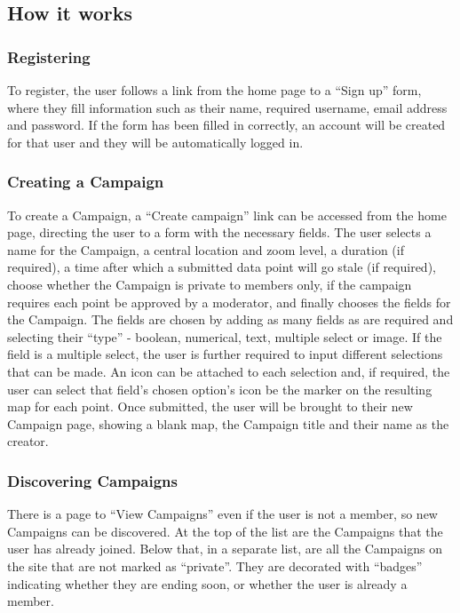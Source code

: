 \documentclass{article}
\begin{document}
		\subsection{How it works}

		\subsubsection{Registering}
		To register, the user follows a link from the home page to a ``Sign up'' form, where they fill information such as their name, required username, email address and password. If the form has been filled in correctly, an account will be created for that user and they will be automatically logged in.

		\subsubsection{Creating a Campaign}
		To create a Campaign, a ``Create campaign'' link can be accessed from the home page, directing the user to a form with the necessary fields. The user selects a name for the Campaign, a central location and zoom level, a duration (if required), a time after which a submitted data point will go stale (if required), choose whether the Campaign is private to members only, if the campaign requires each point be approved by a moderator, and finally chooses the fields for the Campaign. The fields are chosen by adding as many fields as are required and selecting their ``type'' - boolean, numerical, text, multiple select or image. If the field is a multiple select, the user is further required to input different selections that can be made. An icon can be attached to each selection and, if required, the user can select that field's chosen option's icon be the marker on the resulting map for each point. Once submitted, the user will be brought to their new Campaign page, showing a blank map, the Campaign title and their name as the creator.

		\subsubsection{Discovering Campaigns}
		There is a page to ``View Campaigns'' even if the user is not a member, so new Campaigns can be discovered. At the top of the list are the Campaigns that the user has already joined. Below that, in a separate list, are all the Campaigns on the site that are not marked as ``private''. They are decorated with ``badges'' indicating whether they are ending soon, or whether the user is already a member.
\end{document}
